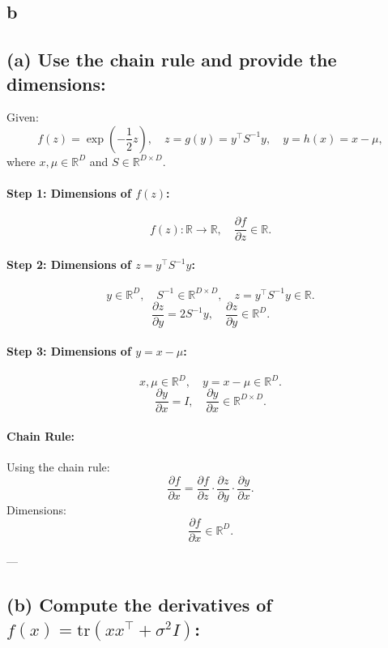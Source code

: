 \documentclass{article}
\begin{document}
\subsection{b}
\subsection*{(a) Use the chain rule and provide the dimensions:}

Given:
\[
f(z) = \exp\left(-\frac{1}{2} z\right), \quad z = g(y) = y^\top S^{-1} y, \quad y = h(x) = x - \mu,
\]
where \(x, \mu \in \mathbb{R}^D\) and \(S \in \mathbb{R}^{D \times D}\).

\paragraph{Step 1: Dimensions of \(f(z)\):}
\[
f(z): \mathbb{R} \to \mathbb{R}, \quad \frac{\partial f}{\partial z} \in \mathbb{R}.
\]

\paragraph{Step 2: Dimensions of \(z = y^\top S^{-1} y\):}
\[
y \in \mathbb{R}^D, \quad S^{-1} \in \mathbb{R}^{D \times D}, \quad z = y^\top S^{-1} y \in \mathbb{R}.
\]
\[
\frac{\partial z}{\partial y} = 2 S^{-1} y, \quad \frac{\partial z}{\partial y} \in \mathbb{R}^D.
\]

\paragraph{Step 3: Dimensions of \(y = x - \mu\):}
\[
x, \mu \in \mathbb{R}^D, \quad y = x - \mu \in \mathbb{R}^D.
\]
\[
\frac{\partial y}{\partial x} = I, \quad \frac{\partial y}{\partial x} \in \mathbb{R}^{D \times D}.
\]

\paragraph{Chain Rule:}
Using the chain rule:
\[
\frac{\partial f}{\partial x} = \frac{\partial f}{\partial z} \cdot \frac{\partial z}{\partial y} \cdot \frac{\partial y}{\partial x}.
\]
Dimensions:
\[
\frac{\partial f}{\partial x} \in \mathbb{R}^D.
\]

---

\subsection*{(b) Compute the derivatives of \(f(x) = \text{tr}(xx^\top + \sigma^2 I)\):}
\end{document}
